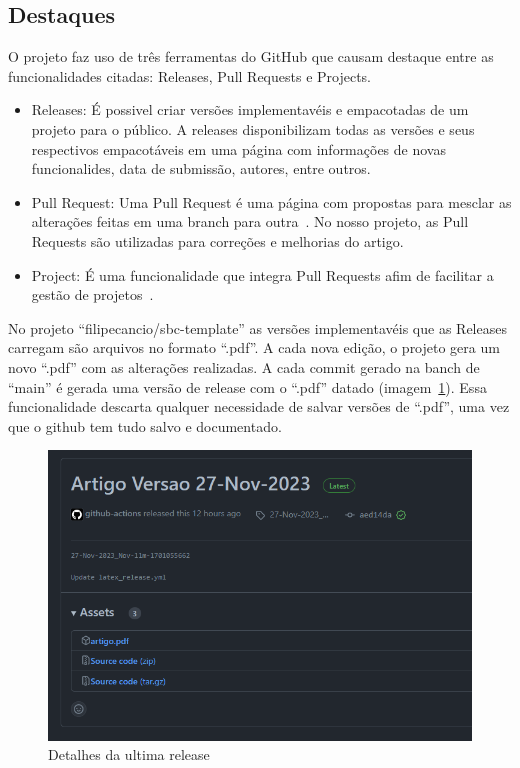 
\subsection{Destaques}

O projeto faz uso de três ferramentas do GitHub que causam destaque entre as funcionalidades citadas: Releases, Pull Requests e Projects.
\begin{itemize}
	\item Releases: É possivel criar versões implementavéis e empacotadas de um projeto para o público. A releases disponibilizam todas as versões e seus respectivos empacotáveis em uma página com informações de novas funcionalides, data de submissão, autores, entre outros.~\cite{github:03}
	\item Pull Request: Uma Pull Request é uma página com propostas para mesclar as alterações feitas em uma branch para outra~\cite{github:04}. No nosso projeto, as Pull Requests são utilizadas para correções e melhorias do artigo.
	\item Project: É uma funcionalidade que integra Pull Requests afim de facilitar a gestão de projetos~\cite{github:05}.
\end{itemize}


No projeto ``filipecancio/sbc-template'' as versões implementavéis que as Releases carregam são arquivos no formato ``.pdf''. A cada nova edição, o projeto gera um novo ``.pdf'' com as alterações realizadas. A cada commit gerado na banch de ``main'' é gerada uma versão de release com o ``.pdf'' datado (imagem~\ref{fig:fig04}). Essa funcionalidade descarta qualquer necessidade de salvar versões de ``.pdf'', uma vez que o github tem tudo salvo e documentado.

\begin{figure}[H]
	\centering
	\includegraphics[width=.6\textwidth]{./images/fig04.png}
	\caption{Detalhes da ultima release}
	\label{fig:fig04}
\end{figure}

